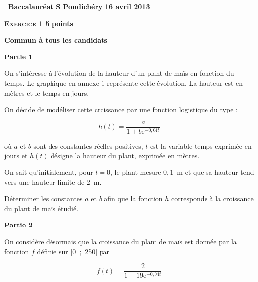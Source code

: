 \documentclass[10pt]{article}
\begin{document}
\renewcommand \footrulewidth{.2pt}
\pagestyle{fancy}
\thispagestyle{empty}

\begin{center}{\Large\textbf{\decofourleft~Baccalauréat S Pondichéry  16 avril 2013~\decofourright}}
\end{center}

\vspace{0,25cm}

\textbf{\textsc{Exercice 1} \hfill 5 points}
 
\textbf{Commun  à tous les candidats}

\medskip

\textbf{Partie 1}

\medskip
 
On s'intéresse à l'évolution de la hauteur d'un plant de maïs en fonction du temps. Le graphique en annexe 1 représente cette évolution. La hauteur est en mètres et le temps en jours.
 
On décide de modéliser cette croissance par une fonction logistique du type : 

\[h(t) = 	\dfrac{a}{1 + b\text{e}^{- 0,04t}}\]

où $a$ et $b$ sont des constantes réelles positives, $t$ est la variable temps exprimée en jours et $h(t)$ désigne la hauteur du plant, exprimée en mètres.
 
On sait qu'initialement, pour $t = 0$, le plant mesure $0,1$~m et que sa hauteur tend vers une hauteur limite de $2$~m.
 
Déterminer les constantes $a$ et $b$ afin que la fonction $h$ corresponde à la croissance du plant de maïs étudié.

\bigskip
 
\textbf{Partie 2}

\medskip

On considère désormais que la croissance du plant de maïs est donnée par la fonction $f$ définie sur [0~;~250] par 

\[f(t) = \dfrac{2}{1 + 19\text{e}^{- 0,04t}}\] 
\end{document}
